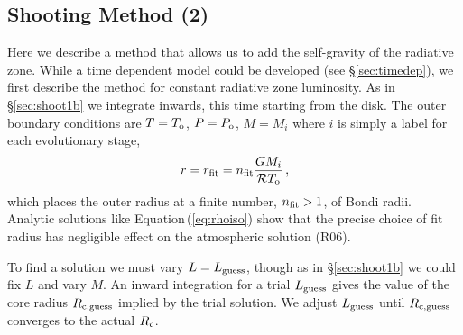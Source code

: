 \documentclass[12pt, preprint,numberedappendix]{emulateapj}
\newcommand{\Eq}[1]{Equation\,(\ref{#1})}
\newcommand{\Rg}{\mathcal{R}}
\newcommand{\co}{_{\rm c}}
\newcommand{\di}{_{\rm o}}
\begin{document}
\subsection{Shooting Method (2)}\label{sec:shoot2}


Here we describe a method that allows us to add the self-gravity of the radiative zone.  While a time dependent model could be developed (see \S\ref{sec:timedep}),  we first describe the method for constant radiative zone luminosity.  As in \S\ref{sec:shoot1b} we integrate inwards, this time starting from the disk. The outer boundary conditions are $T = T\di$,  $P = P\di$,  $M = M_i$ where $i$ is simply a label for each evolutionary stage, 
\begin{equation}
r = r_{\rm fit} = n_{\rm fit}{ G M_i \over \Rg T\di}\, ,
\end{equation} 
which places the outer radius at a finite number, $n_{\rm fit} > 1$, of Bondi radii.  Analytic solutions like \Eq{eq:rhoiso} show that the precise choice of fit radius has negligible effect on the atmospheric solution (R06).  

To find a solution we must vary $L = L_{\rm guess}$,  though as in \S\ref{sec:shoot1b} we could fix $L$ and vary  $M$.   An inward integration for a trial $L_{\rm guess}$  gives the value of the core radius $R_{\rm c, guess}$ implied by the trial solution.  We adjust $L_{\rm guess}$ until $R_{\rm c, guess}$ converges to the actual $R\co$.  
\end{document}
